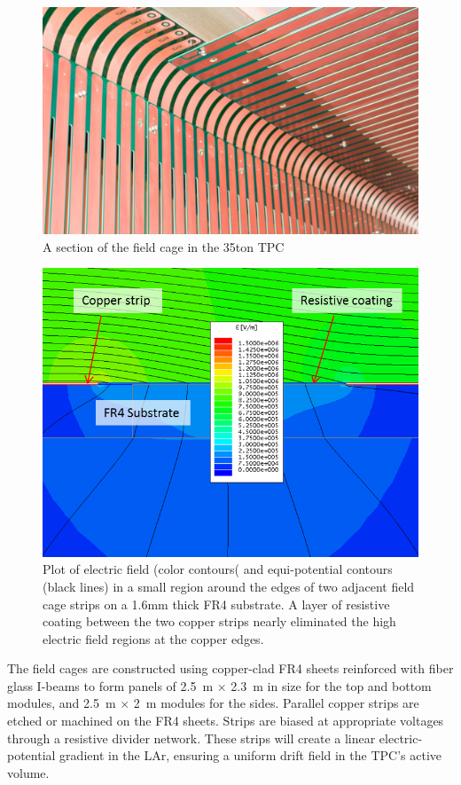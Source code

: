 \begin{figure}[ht]
\centering
\includegraphics[width=5in]{figures/TPC_FCA_1}
\caption{A section of the field cage in the 35ton TPC }
\label{fig:tpc_fca_1}
\end{figure}    



\begin{figure}[hb]
\centering
\includegraphics[width=5in]{figures/TPC_FCA_2}
\caption{Plot of electric field (color contours( and equi-potential contours (black lines) in a small region around the edges of two adjacent field cage strips on a 1.6mm thick FR4 substrate.  A layer of resistive coating between the two copper strips nearly eliminated the high electric field regions at the copper edges.}
\label{fig:tpc_fca_2}
\end{figure}    

The field cages are constructed using copper-clad FR4 sheets reinforced with fiber glass I-beams to form panels of 2.5~m $\times$ 2.3~m in size for the top and bottom modules, and 2.5~m $\times$ 2~m modules for the sides.  Parallel copper strips are etched or machined on the FR4 sheets.  Strips are biased at appropriate voltages through a resistive divider network. These strips will create a linear electric-potential gradient in the LAr, ensuring a uniform drift field in the TPC's active volume. 
 
